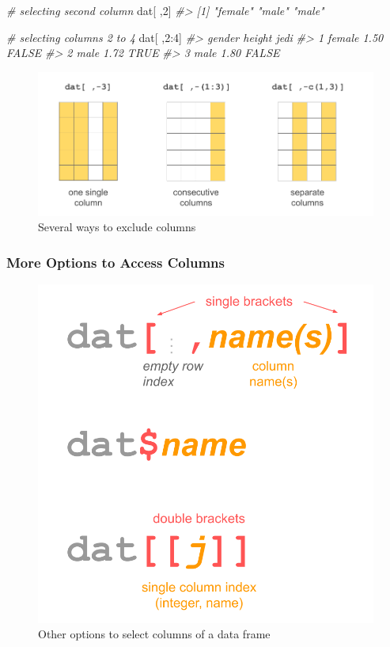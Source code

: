 \documentclass[
]{book}
\newenvironment{Shaded}{\begin{snugshade}}{\end{snugshade}}
\newcommand{\CommentTok}[1]{\textcolor[rgb]{0.56,0.35,0.01}{\textit{#1}}}
\newcommand{\DecValTok}[1]{\textcolor[rgb]{0.00,0.00,0.81}{#1}}
\newcommand{\NormalTok}[1]{#1}
\newcommand{\SpecialCharTok}[1]{\textcolor[rgb]{0.00,0.00,0.00}{#1}}
\begin{document}
\begin{Shaded}
\begin{Highlighting}[]
\CommentTok{\# selecting second column}
\NormalTok{dat[ ,}\DecValTok{2}\NormalTok{]}
\CommentTok{\#\textgreater{} [1] "female" "male"   "male"}

\CommentTok{\# selecting columns 2 to 4}
\NormalTok{dat[ ,}\DecValTok{2}\SpecialCharTok{:}\DecValTok{4}\NormalTok{]}
\CommentTok{\#\textgreater{}   gender height  jedi}
\CommentTok{\#\textgreater{} 1 female   1.50 FALSE}
\CommentTok{\#\textgreater{} 2   male   1.72  TRUE}
\CommentTok{\#\textgreater{} 3   male   1.80 FALSE}
\end{Highlighting}
\end{Shaded}

\begin{figure}

{\centering \includegraphics[width=0.8\linewidth]{images/objects/obj-dataframe-cols2} 

}

\caption{Several ways to exclude columns}\label{fig:unnamed-chunk-159}
\end{figure}

\hypertarget{more-options-to-access-columns}{%
\subsubsection*{More Options to Access Columns}\label{more-options-to-access-columns}}

\begin{figure}

{\centering \includegraphics[width=0.5\linewidth]{images/objects/obj-dataframe-names} 

}

\caption{Other options to select columns of a data frame}\label{fig:unnamed-chunk-160}
\end{figure}
\end{document}

